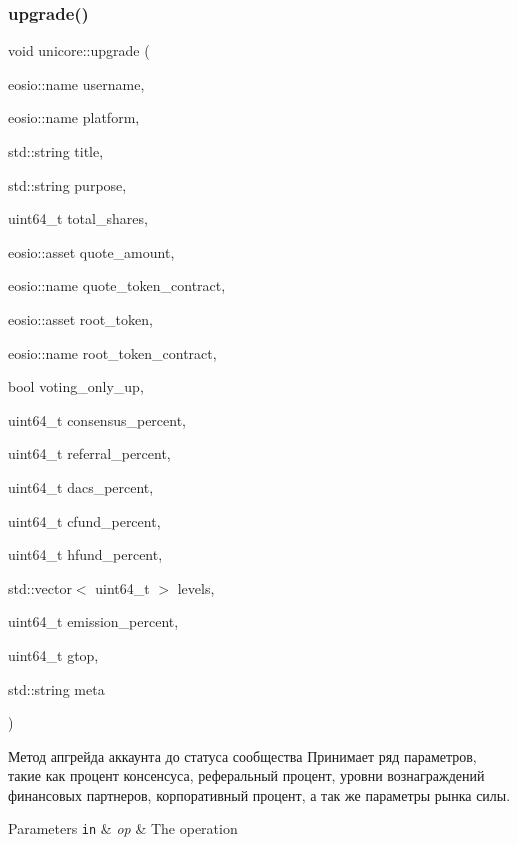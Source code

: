 \subsubsection{\texorpdfstring{upgrade()}{upgrade()}}
{\footnotesize\ttfamily void unicore\+::upgrade (\begin{DoxyParamCaption}\item[{eosio\+::name}]{username,  }\item[{eosio\+::name}]{platform,  }\item[{std\+::string}]{title,  }\item[{std\+::string}]{purpose,  }\item[{uint64\+\_\+t}]{total\+\_\+shares,  }\item[{eosio\+::asset}]{quote\+\_\+amount,  }\item[{eosio\+::name}]{quote\+\_\+token\+\_\+contract,  }\item[{eosio\+::asset}]{root\+\_\+token,  }\item[{eosio\+::name}]{root\+\_\+token\+\_\+contract,  }\item[{bool}]{voting\+\_\+only\+\_\+up,  }\item[{uint64\+\_\+t}]{consensus\+\_\+percent,  }\item[{uint64\+\_\+t}]{referral\+\_\+percent,  }\item[{uint64\+\_\+t}]{dacs\+\_\+percent,  }\item[{uint64\+\_\+t}]{cfund\+\_\+percent,  }\item[{uint64\+\_\+t}]{hfund\+\_\+percent,  }\item[{std\+::vector$<$ uint64\+\_\+t $>$}]{levels,  }\item[{uint64\+\_\+t}]{emission\+\_\+percent,  }\item[{uint64\+\_\+t}]{gtop,  }\item[{std\+::string}]{meta }\end{DoxyParamCaption})}



Метод апгрейда аккаунта до статуса сообщества Принимает ряд параметров, такие как процент консенсуса, реферальный процент, уровни вознаграждений финансовых партнеров, корпоративный процент, а так же параметры рынка силы. 


\begin{DoxyParams}[1]{Parameters}
\mbox{\tt in}  & {\em op} & The operation \\
\hline
\end{DoxyParams}
\mbox{\label{classunicore_a25c98e5ea071940b6ab153d71a328a5c}} 
